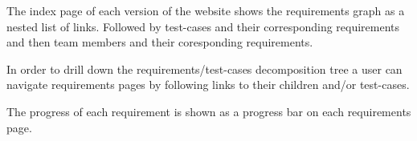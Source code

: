 \documentclass[11pt,a4paper]{article}
\begin{document}
	The index page of each version of the website shows the requirements graph as a nested list of links. Followed by test-cases and their corresponding requirements and then team members and their coresponding requirements. 
	
	In order to drill down the requirements/test-cases decomposition tree a user can navigate requirements pages by following links to their children and/or test-cases. 
	
	The progress of each requirement is shown as a progress bar on each requirements page.
	
	
\printbibliography
\end{document}
